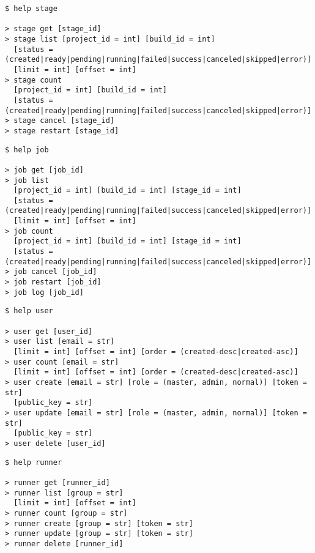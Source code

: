 {\begin{listing}[H]
\begin{verbatim}
$ help stage

> stage get [stage_id]
> stage list [project_id = int] [build_id = int]
  [status = (created|ready|pending|running|failed|success|canceled|skipped|error)]
  [limit = int] [offset = int]
> stage count
  [project_id = int] [build_id = int]
  [status = (created|ready|pending|running|failed|success|canceled|skipped|error)]
> stage cancel [stage_id]
> stage restart [stage_id]
\end{verbatim}
\end{listing}

\begin{listing}[H]
\begin{verbatim}
$ help job

> job get [job_id]
> job list
  [project_id = int] [build_id = int] [stage_id = int]
  [status = (created|ready|pending|running|failed|success|canceled|skipped|error)]
  [limit = int] [offset = int]
> job count
  [project_id = int] [build_id = int] [stage_id = int]
  [status = (created|ready|pending|running|failed|success|canceled|skipped|error)]
> job cancel [job_id]
> job restart [job_id]
> job log [job_id]
\end{verbatim}
\end{listing}

\begin{listing}[H]
\begin{verbatim}
$ help user

> user get [user_id]
> user list [email = str]
  [limit = int] [offset = int] [order = (created-desc|created-asc)]
> user count [email = str]
  [limit = int] [offset = int] [order = (created-desc|created-asc)]
> user create [email = str] [role = (master, admin, normal)] [token = str]
  [public_key = str]
> user update [email = str] [role = (master, admin, normal)] [token = str]
  [public_key = str]
> user delete [user_id]
\end{verbatim}
\end{listing}

\begin{listing}[H]
\begin{verbatim}
$ help runner

> runner get [runner_id]
> runner list [group = str]
  [limit = int] [offset = int]
> runner count [group = str]
> runner create [group = str] [token = str]
> runner update [group = str] [token = str]
> runner delete [runner_id]
\end{verbatim}
\end{listing}
}

